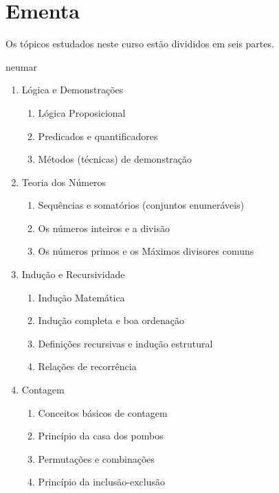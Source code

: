 \chapter*{Ementa}

Os t\'opicos estudados neste curso est\~ao divididos em seis partes.

neumar

\begin{enumerate}
\item L\'ogica e Demonstra\c{c}\~oes
\begin{enumerate}
\item L\'ogica Proposicional
\item Predicados e quantificadores
\item M\'etodos (t\'ecnicas) de demonstra\c{c}\~ao
\end{enumerate}

\item Teoria dos N\'umeros
\begin{enumerate}
\item Sequ\^encias e somat\'orios (conjuntos enumer\'aveis)
\item Os n\'umeros inteiros e a divis\~ao
\item Os n\'umeros primos e os M\'aximos divisores comuns
\end{enumerate}

\item Indu\c{c}\~ao e Recursividade
\begin{enumerate}
\item Indu\c{c}\~ao Matem\'atica
\item Indu\c{c}\~ao completa e boa ordena\c{c}\~ao
\item Defini\c{c}\~oes recursivas e indu\c{c}\~ao estrutural
\item Rela\c{c}\~oes de recorr\^encia
\end{enumerate}

\item Contagem
\begin{enumerate}
\item Conceitos b\'asicos de contagem
\item Princ\'ipio da casa dos pombos
\item Permuta\c{c}\~oes e combina\c{c}\~oes
\item Princ\'ipio da inclus\~ao-exclus\~ao
\end{enumerate}


\end{enumerate}
